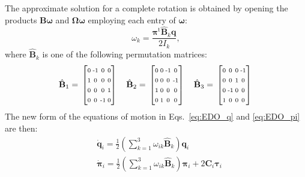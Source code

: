 \documentclass[aip,jcp,reprint,amsmath,amssymb]{revtex4-1}
\makeatletter
\newcommand{\mt}[1]{\boldsymbol{\mathbf{#1}}}           %
\newcommand{\vt}[1]{\boldsymbol{\mathbf{#1}}}           %
\newcommand{\tr}[1]{#1^\text{t}}                        %
\newenvironment{smallarray}[1]                          %
{\null\,\vcenter\bgroup\scriptsize
	\renewcommand{\arraystretch}{1.5}
	\arraycolsep=.13885em
	\hbox\bgroup$\left[\array{@{}#1@{}}}
{\endarray\right]$\egroup\egroup\,\null}
\makeatother
\begin{document}
The approximate solution for a complete rotation is obtained by opening the products $\mt B \vt \omega$ and $\mt \Omega \vt \omega$ employing each entry of $\vt \omega$: 
\begin{equation}
\label{eq:omega_entry}
\omega_k = \frac{\tr{\vt \pi} \hat{\mt B}_k \vt q}{2 I_k},
\end{equation}
where $\hat{\mt B}_k$ is one of the following permutation matrices:
\[
\hat{\mt B}_1 = \begin{smallarray}{cccc}
 0 & \text{-}1 &  0 &  0 \\
 1 &  0 &  0 &  0 \\
 0 &  0 &  0 &  1 \\
 0 &  0 & \text{-}1 &  0 \\
\end{smallarray} \quad
\hat{\mt B}_2 = \begin{smallarray}{cccc}
 0 &  0 & \text{-}1 &  0 \\
 0 &  0 &  0 & \text{-}1 \\
 1 &  0 &  0 &  0 \\
 0 &  1 &  0 &  0 \\
\end{smallarray} \quad
\hat{\mt B}_3 = \begin{smallarray}{cccc}
 0 &  0 &  0 & \text{-}1 \\
 0 &  0 &  1 &  0 \\
 0 & \text{-}1 &  0 &  0 \\
 1 &  0 &  0 &  0 \\
\end{smallarray}
\]
The new form of the equations of motion in Eqs.~\eqref{eq:EDO_q} and \eqref{eq:EDO_pi} are then:
\begin{subequations}
\label{eq:EDO_system_alternative}
\begin{align}
&\dot{\vt q}_i = \frac{1}{2} \left( \sum_{k=1}^3 \omega_{ik} \hat{\mt B}_k \right) \vt q_i \label{eq:edo_q} \\
&\dot{\vt \pi}_i = \frac{1}{2} \left( \sum_{k=1}^3 \omega_{ik} \hat{\mt B}_k \right) \vt \pi_i + 2 \mt C_i \vt \tau_i \label{eq:edo_pi}
\end{align}
\end{subequations}
\end{document}
